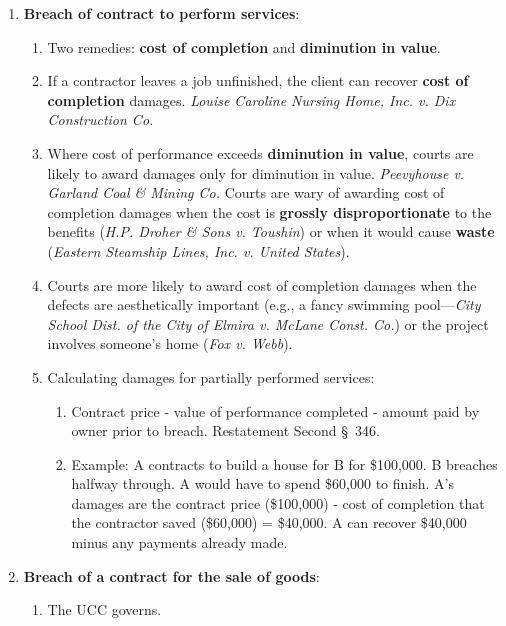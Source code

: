 \begin{enumerate}
    \item \textbf{Breach of contract to perform services}:
    \begin{enumerate}
        \item Two remedies: \textbf{cost of completion} and \textbf{diminution 
        in value}.
        \item If a contractor leaves a job unfinished, the client can recover 
        \textbf{cost of completion} damages. \emph{Louise Caroline Nursing 
        Home, Inc. v. Dix Construction Co.}
        \item Where cost of performance exceeds \textbf{diminution in value}, 
        courts are likely to award damages only for diminution in value.  
        \emph{Peevyhouse v. Garland Coal \& Mining Co.} Courts are wary of 
        awarding cost of completion damages when the cost is \textbf{grossly 
        disproportionate} to the benefits (\emph{H.P. Droher \& Sons v. 
        Toushin}) or when it would cause \textbf{waste} (\emph{Eastern 
        Steamship Lines, Inc. v.  United States}).
        \item Courts are more likely to award cost of completion damages when 
        the defects are aesthetically important (e.g., a fancy swimming 
        pool---\emph{City School Dist. of the City of Elmira v.  McLane Const.  
        Co.}) or the project involves someone's home (\emph{Fox v. Webb}).  
        \item Calculating damages for partially performed services:
        \begin{enumerate}
            \item Contract price - value of performance completed - amount 
            paid by owner prior to breach. Restatement Second \S\ 346.
            \item Example: A contracts to build a house for B for \$100,000. B 
            breaches halfway through. A would have to spend \$60,000 to 
            finish.  A's damages are the contract price (\$100,000) - cost of 
            completion that the contractor saved (\$60,000) = \$40,000. A can 
            recover \$40,000 minus any payments already made.
        \end{enumerate}
    \end{enumerate}
    \item \textbf{Breach of a contract for the sale of goods}:
    \begin{enumerate}
        \item The UCC governs.

\end{enumerate}
\end{enumerate}
